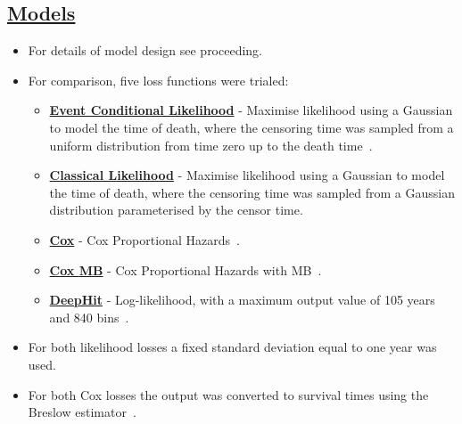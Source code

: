 \documentclass[portrait, color=UCLburgundy, margin=1cm]{uclposter}
\begin{document}
    \begin{multicols}{2}
            \subsection*{\underline{\textbf{Models}}}
                \begin{itemize}
                    \item For details of model design see proceeding.
            
                    \item For comparison, five loss functions were trialed:
            
                    \begin{itemize}
                        \item \underline{\textbf{Event Conditional Likelihood}} - Maximise likelihood using a Gaussian to model the time of death, where the censoring time was sampled from a uniform distribution from time zero up to the death time~\cite{Shahin2023DeepAnalysis}.
            
                        \item \underline{\textbf{Classical Likelihood}} - Maximise likelihood using a Gaussian to model the time of death, where the censoring time was sampled from a Gaussian distribution parameterised by the censor time.
            
                        \item \underline{\textbf{Cox}} - Cox Proportional Hazards~\cite{Cox1972RegressionLife-Tables}.
            
                        \item \underline{\textbf{Cox \gls{MB}}} - Cox Proportional Hazards with \gls{MB}~\cite{Shahin2022SurvivalData}.
            
                        \item \underline{\textbf{DeepHit}} - Log-likelihood, with a maximum output value of 105 years and 840 bins~\cite{Lee2018DeepHit:Risks}.
                    \end{itemize}
            
                    \item For both likelihood losses a fixed standard deviation equal to one year was used.
                    
                    \item For both Cox losses the output was converted to survival times using the Breslow estimator~\cite{Breslow1974CovarianceData}.
                \end{itemize}


\end{multicols}
\end{document}
